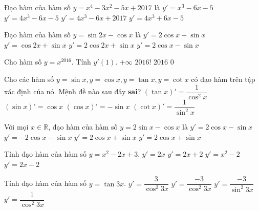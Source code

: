 \begin{ex}%
	Đạo hàm của hàm số $y=x^4-3x^2-5x+2017$ là 
	\choice 
		 {$y'=x^3-6x-5$}
		{\True  $y'=4x^3-6x-5$}
		{$y'=4x^3-6x+2017$} 
		{$y'=4x^3+6x-5$} 
\end{ex}

\begin{ex}%
	Đạo hàm của hàm số $ y=\sin  2x-\cos x$ là
	\choice 
		{$y'=2\cos  x+\sin x$}
		{$y'=\cos 2x+\sin  x$}
		{\True  $y'=2\cos 2x+\sin x$}
		{$y'=2\cos x-\sin  x$}
\end{ex}

\begin{ex}%
	Cho  hàm số $y=x^{2016}$. Tính $y'(1)$.
	 \choice
		{$+\infty$} 
		{$2016!$} 
		{\True  $2016$}
		 {$0$}
\end{ex}

\begin{ex}%
	Cho các hàm số $y=\sin x,y=\cos x,y=\tan x,y=\cot x$ có đạo hàm trên tập xác định của nó.  Mệnh đề nào sau đây \textbf{sai}?
	 \choice
		{${\left(\tan  x\right)}'=\dfrac{1}{\cos^2x}$}
		{${\left(\sin x\right)}'=\cos  x$}
		 {${\left(\cos x\right)}'=-\sin x$}
		{\True ${\left(\cot x\right)}'=\dfrac{1}{\sin^2x}$} 
\end{ex}

\begin{ex}%
	Với mọi  $x\in\mathbb{R}$, đạo hàm của hàm số $y=2\sin x-\cos x$ là
	 \choice
		{$y'=2\cos x-\sin x$} 
		{$y'=-2\cos  x-\sin x$}
		{$y'=2\cos x+\sin  x$}
		{\True  $y'=2\cos x+\sin x$}
\end{ex}

\begin{ex}%
	Tính đạo hàm của  hàm số $y=x^2-2x+3$.
	 \choice
		{$y'=2x $} 
		{$y'=2x+2 $} 
		{$y'=x^2-2 $} 
		 {\True $y'=2x-2 $}
\end{ex}

\begin{ex}%
	Tính đạo hàm của hàm số $y=\tan 3x$. 
	\choice 
		{\True $y'=\dfrac{3}{\cos^{2}3x}$} 
		{$y'=\dfrac{-3}{\cos^{2}3x}$} 
		{$y'=\dfrac{-3}{\sin^{2}3x}$} 
		 {$y'=\dfrac{1}{\cos^{2}3x}$}
\end{ex}

